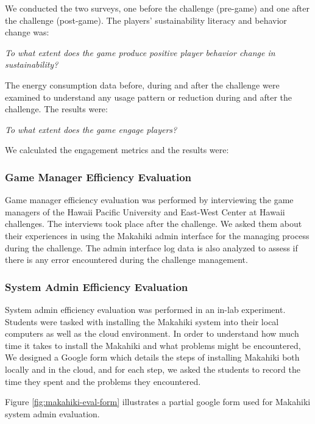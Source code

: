 \documentclass{sigchi}
\begin{document}
We conducted the two surveys, one before the challenge (pre-game) and
one after the challenge (post-game). The players' sustainability
literacy and behavior change was:

\emph{To what extent does the game produce positive player behavior
  change in sustainability?}

The energy consumption data before, during and after the challenge were
examined to understand any usage pattern or reduction during and after
the challenge. The results were:

\emph{To what extent does the game engage players?}

We calculated the engagement metrics and the results were:


\subsubsection{Game Manager Efficiency Evaluation}

Game manager efficiency evaluation was performed by interviewing the
game managers of the Hawaii Pacific University and East-West Center at
Hawaii challenges. The interviews took place after the challenge. We
asked them about their experiences in using the Makahiki admin
interface for the managing process during the challenge. The admin
interface log data is also analyzed to assess if there is any error
encountered during the challenge management.


\subsubsection{System Admin Efficiency Evaluation}

System admin efficiency evaluation was performed in an in-lab
experiment. Students were tasked with installing the Makahiki
system into their local computers as well as the cloud environment. In
order to understand how much time it takes to install the Makahiki and
what problems might be encountered, We designed a Google form which
details the steps of installing Makahiki both locally and in the
cloud, and for each step, we asked the students to record the time
they spent and the problems they encountered.

Figure \ref{fig:makahiki-eval-form} illustrates a partial google form
used for Makahiki system admin evaluation.
\end{document}
